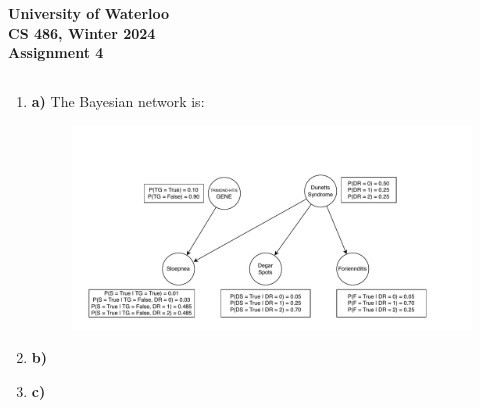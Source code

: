 \documentclass[12pt]{article}
\begin{document}
\begin{center}
  {\Large\bf University of Waterloo}\\ \vspace{3mm}
  {\Large\bf CS 486, Winter 2024}\\ \vspace{2mm}
  {\Large\bf Assignment 4}\\ \vspace{3mm}
\end{center}

\def\question#1{\item[\bf #1.]}
\def\part#1{\item[\bf #1)]}
\newcommand{\pc}[1]{\mbox{\textbf{#1}}} %

\subsection{} 
\begin{enumerate}

\part{a} 
The Bayesian network is:
\begin{figure}[h]
	\center
	\includegraphics[width=\linewidth]{Q1a.pdf}
\end{figure}

\part{b} 

\part{c} 

\end{enumerate}
\end{document}

